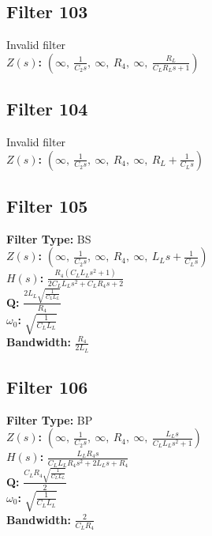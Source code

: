 \documentclass{article}
\begin{document}
\subsection*{Filter 103}
Invalid filter \\ 
\textbf{$Z(s)$:} $\left( \infty, \  \frac{1}{C_{2} s}, \  \infty, \  R_{4}, \  \infty, \  \frac{R_{L}}{C_{L} R_{L} s + 1}\right)$ \\ 
\subsection*{Filter 104}
Invalid filter \\ 
\textbf{$Z(s)$:} $\left( \infty, \  \frac{1}{C_{2} s}, \  \infty, \  R_{4}, \  \infty, \  R_{L} + \frac{1}{C_{L} s}\right)$ \\ 
\subsection*{Filter 105}
\textbf{Filter Type:} BS \\ 
\textbf{$Z(s)$:} $\left( \infty, \  \frac{1}{C_{2} s}, \  \infty, \  R_{4}, \  \infty, \  L_{L} s + \frac{1}{C_{L} s}\right)$ \\ 
\textbf{$H(s)$:} $\frac{R_{4} \left(C_{L} L_{L} s^{2} + 1\right)}{2 C_{L} L_{L} s^{2} + C_{L} R_{4} s + 2}$ \\ 
\textbf{Q:} $\frac{2 L_{L} \sqrt{\frac{1}{C_{L} L_{L}}}}{R_{4}}$ \\ 
\textbf{$\omega_0$:} $\sqrt{\frac{1}{C_{L} L_{L}}}$ \\ 
\textbf{Bandwidth:} $\frac{R_{4}}{2 L_{L}}$ \\ 
\subsection*{Filter 106}
\textbf{Filter Type:} BP \\ 
\textbf{$Z(s)$:} $\left( \infty, \  \frac{1}{C_{2} s}, \  \infty, \  R_{4}, \  \infty, \  \frac{L_{L} s}{C_{L} L_{L} s^{2} + 1}\right)$ \\ 
\textbf{$H(s)$:} $\frac{L_{L} R_{4} s}{C_{L} L_{L} R_{4} s^{2} + 2 L_{L} s + R_{4}}$ \\ 
\textbf{Q:} $\frac{C_{L} R_{4} \sqrt{\frac{1}{C_{L} L_{L}}}}{2}$ \\ 
\textbf{$\omega_0$:} $\sqrt{\frac{1}{C_{L} L_{L}}}$ \\ 
\textbf{Bandwidth:} $\frac{2}{C_{L} R_{4}}$ \\ 
\end{document}
